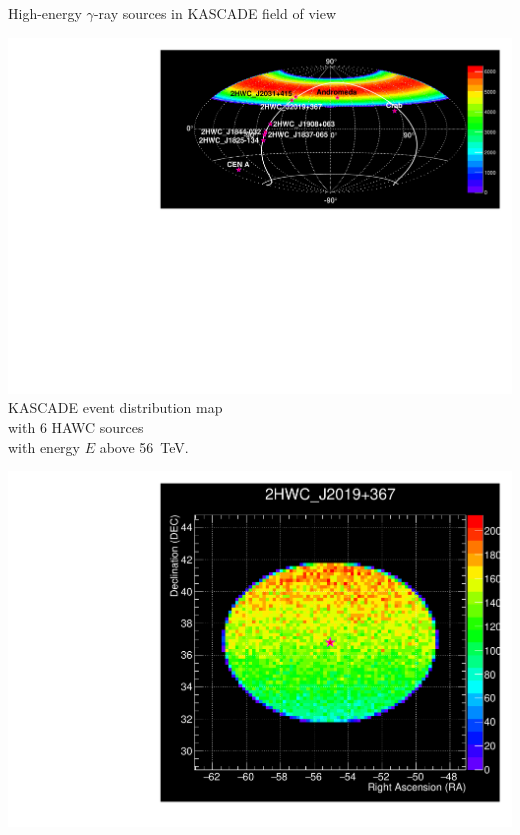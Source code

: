 \begin{frame}{High-energy $\gamma$-ray sources in KASCADE field of view}
\begin{minipage}[c]{0.73\textwidth}
\begin{center}
  \includegraphics[width=1\textwidth]{pics/Skymap_6srcs.pdf}\\
  KASCADE event distribution map\\
  with 6 HAWC sources\\
  with energy $E$ above 56~TeV.
\end{center}
\end{minipage}
\hfill
\begin{minipage}[c]{0.25\textwidth}
\includegraphics[width=1\textwidth]{pics/Skymap_2HWC_J2019+367.pdf}\\

\end{minipage}
\end{frame}
